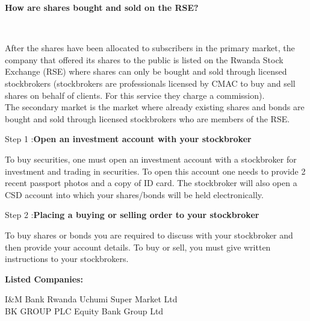 \documentclass{article}
\begin{document}
\begin{titlepage}
\begin{titlepage}
\end{titlepage}
\begin{titlepage}
     \begin{center}
  \textbf{\huge{How are shares bought and sold on the RSE?}}
    \end{center}
    \\
    \begin{flushleft}
        \Large
    After the shares have been allocated to subscribers in the primary market, the company that offered its shares to the public is listed on the Rwanda Stock Exchange (RSE) where shares can only be bought and sold through licensed stockbrokers (stockbrokers are professionals licensed by CMAC to buy and sell shares on behalf of clients. For this service they charge a commission).
\\

The secondary market is the market where already existing shares and bonds are bought and sold through licensed stockbrokers who are members of the RSE.\
\vspace{0.3cm}
\Large

Step 1 :\textbf{Open an investment account with your stockbroker}
\vspace{0.2cm}

To buy securities, one must open an investment account with a stockbroker for investment and trading in securities. To open this account one needs to provide 2 recent passport photos and a copy of ID card. The stockbroker will also open a CSD account into which your shares/bonds will be held electronically.

\vspace{0.2cm}

Step 2 :\textbf{Placing a buying or selling order to your stockbroker}
\vspace{0.2cm}

To buy shares or bonds you are required to discuss with your stockbroker and then provide your account details. To buy or sell, you must give written instructions to your stockbrokers.
\vspace{0.4cm}

\textbf{Listed Companies:}

\end{flushleft}
\large

I&M Bank Rwanda \hspace{3cm}   Uchumi Super Market Ltd
\\

BK GROUP PLC  \hspace{3cm}    Equity Bank Group Ltd
\\


\end{titlepage}
\end{titlepage}
\end{document}
